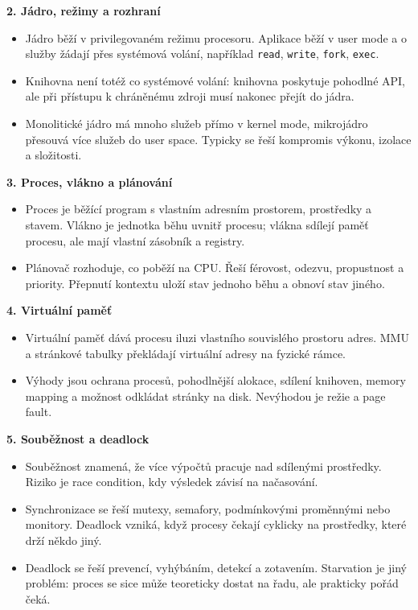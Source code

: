 \documentclass[11pt,a4paper]{article}
\begin{document}
\textbf{2. Jádro, režimy a rozhraní}
\begin{itemize}
  \item Jádro běží v privilegovaném režimu procesoru. Aplikace běží v user mode a o služby žádají přes systémová volání, například \texttt{read}, \texttt{write}, \texttt{fork}, \texttt{exec}.
  \item Knihovna není totéž co systémové volání: knihovna poskytuje pohodlné API, ale při přístupu k chráněnému zdroji musí nakonec přejít do jádra.
  \item Monolitické jádro má mnoho služeb přímo v kernel mode, mikrojádro přesouvá více služeb do user space. Typicky se řeší kompromis výkonu, izolace a složitosti.
\end{itemize}

\textbf{3. Proces, vlákno a plánování}
\begin{itemize}
  \item Proces je běžící program s vlastním adresním prostorem, prostředky a stavem. Vlákno je jednotka běhu uvnitř procesu; vlákna sdílejí paměť procesu, ale mají vlastní zásobník a registry.
  \item Plánovač rozhoduje, co poběží na CPU. Řeší férovost, odezvu, propustnost a priority. Přepnutí kontextu uloží stav jednoho běhu a obnoví stav jiného.
\end{itemize}

\textbf{4. Virtuální paměť}
\begin{itemize}
  \item Virtuální paměť dává procesu iluzi vlastního souvislého prostoru adres. MMU a stránkové tabulky překládají virtuální adresy na fyzické rámce.
  \item Výhody jsou ochrana procesů, pohodlnější alokace, sdílení knihoven, memory mapping a možnost odkládat stránky na disk. Nevýhodou je režie a page fault.
\end{itemize}

\textbf{5. Souběžnost a deadlock}
\begin{itemize}
  \item Souběžnost znamená, že více výpočtů pracuje nad sdílenými prostředky. Riziko je race condition, kdy výsledek závisí na načasování.
  \item Synchronizace se řeší mutexy, semafory, podmínkovými proměnnými nebo monitory. Deadlock vzniká, když procesy čekají cyklicky na prostředky, které drží někdo jiný.
  \item Deadlock se řeší prevencí, vyhýbáním, detekcí a zotavením. Starvation je jiný problém: proces se sice může teoreticky dostat na řadu, ale prakticky pořád čeká.
\end{itemize}
\end{document}
